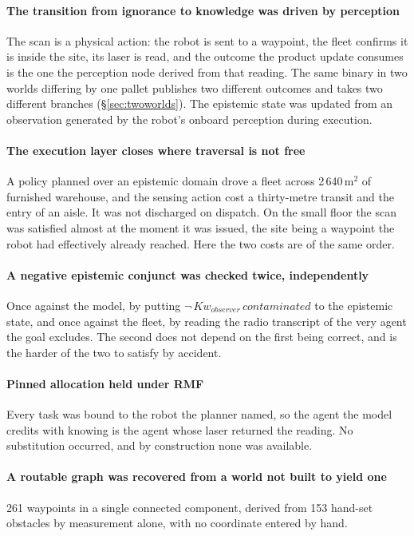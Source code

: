 \documentclass[11pt,a4paper]{article}
\theoremstyle{definition}
\newcommand{\Kw}[1]{\mathit{Kw}_{#1}}
\begin{document}
\paragraph{The transition from ignorance to knowledge was driven by perception}
The scan is a physical action: the robot is sent to a waypoint, the fleet
confirms it is inside the site, its laser is read, and the outcome the product
update consumes is the one the perception node derived from that reading. The
same binary in two worlds differing by one pallet publishes two different
outcomes and takes two different branches (\S\ref{sec:twoworlds}). The epistemic
state was updated from an observation generated by the robot's onboard
perception during execution.

\paragraph{The execution layer closes where traversal is not free} A policy
planned over an epistemic domain drove a fleet across 2\,640\,m$^2$ of furnished
warehouse, and the sensing action cost a thirty-metre transit and the entry of an aisle. It was not discharged on dispatch. On the small floor the scan
was satisfied almost at the moment it was issued, the site being a waypoint the
robot had effectively already reached. Here the two costs are of the same order.

\paragraph{A negative epistemic conjunct was checked twice, independently} Once
against the model, by putting $\neg\,\Kw{\mathit{observer}}\,\mathit{contaminated}$
to the epistemic state, and once against the fleet, by reading the radio
transcript of the very agent the goal excludes. The second does not depend on
the first being correct, and is the harder of the two to satisfy by accident.

\paragraph{Pinned allocation held under RMF} Every task was bound to the robot
the planner named, so the agent the model credits with knowing is the agent
whose laser returned the reading. No substitution occurred, and by construction
none was available.

\paragraph{A routable graph was recovered from a world not built to yield one}
261 waypoints in a single connected component, derived from 153 hand-set
obstacles by measurement alone, with no coordinate entered by hand.
\end{document}
